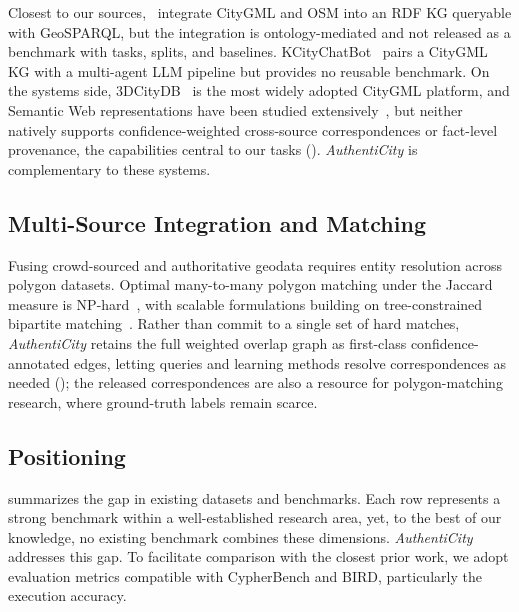 \documentclass[sigconf,authordraft]{acmart}
\newcommand{\benchname}{\textit{Authenti\-City}}
\begin{document}
Closest to our sources,~\citet{ding_osmgraph_2025} integrate CityGML and OSM into an RDF KG queryable with GeoSPARQL, but the integration is ontology-mediated and not released as a benchmark with tasks, splits, and baselines. KCityChatBot~\cite{liu_kcitychatbot_2025} pairs a CityGML KG with a multi-agent LLM pipeline but provides no reusable benchmark. On the systems side, 3DCityDB~\cite{yao_3dcitydb_2018, yao_3dcitydb5_2025} is the most widely adopted CityGML platform, and Semantic Web representations have been studied extensively~\cite{chadzynski_sem3dcitydb_2021}, but neither natively supports confidence-weighted cross-source correspondences or fact-level provenance, the capabilities central to our tasks (). \benchname{} is complementary to these systems.

\subsection{Multi-Source Integration and Matching}

Fusing crowd-sourced and authoritative geodata requires entity resolution across polygon datasets. Optimal many-to-many polygon matching under the Jaccard measure is NP-hard~\cite{naumann_nnmatching_2024}, with scalable formulations building on tree-constrained bipartite matching~\cite{canzar_treematching_2011, naumann_nnmatching_2025}. Rather than commit to a single set of hard matches, \benchname{} retains the full weighted overlap graph as first-class confidence-annotated edges, letting queries and learning methods resolve correspondences as needed (); the released correspondences are also a resource for polygon-matching research, where ground-truth labels remain scarce.

\subsection{Positioning}

 summarizes the gap in existing datasets and benchmarks. Each row represents a strong benchmark within a well-established research area, yet, to the best of our knowledge, no existing benchmark combines these dimensions. \benchname{} addresses this gap. To facilitate comparison with the closest prior work, we adopt evaluation metrics compatible with CypherBench and BIRD, particularly the execution accuracy.
\end{document}
